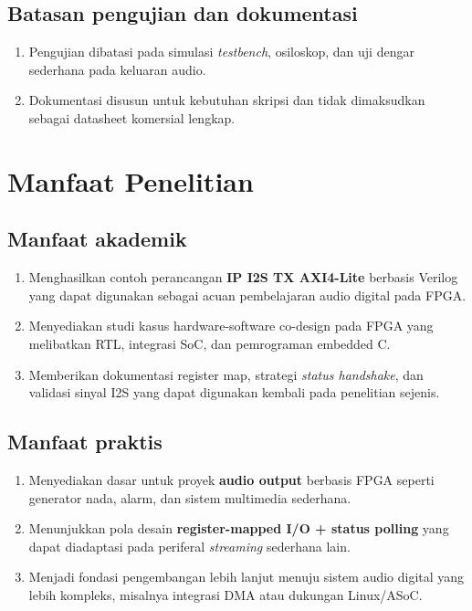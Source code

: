 \subsection{Batasan pengujian dan dokumentasi}
\begin{enumerate}
	\item Pengujian dibatasi pada simulasi \textit{testbench}, osiloskop, dan uji dengar sederhana pada keluaran audio.
	\item Dokumentasi disusun untuk kebutuhan skripsi dan tidak dimaksudkan sebagai datasheet komersial lengkap.
\end{enumerate}

\section{Manfaat Penelitian}

\subsection{Manfaat akademik}
\begin{enumerate}
	\item Menghasilkan contoh perancangan \textbf{IP I2S TX AXI4-Lite} berbasis Verilog yang dapat digunakan sebagai acuan pembelajaran audio digital pada FPGA.
	\item Menyediakan studi kasus hardware-software co-design pada FPGA yang melibatkan RTL, integrasi SoC, dan pemrograman embedded C.
	\item Memberikan dokumentasi register map, strategi \textit{status handshake}, dan validasi sinyal I2S yang dapat digunakan kembali pada penelitian sejenis.
\end{enumerate}

\subsection{Manfaat praktis}
\begin{enumerate}
	\item Menyediakan dasar untuk proyek \textbf{audio output} berbasis FPGA seperti generator nada, alarm, dan sistem multimedia sederhana.
	\item Menunjukkan pola desain \textbf{register-mapped I/O + status polling} yang dapat diadaptasi pada periferal \textit{streaming} sederhana lain.
	\item Menjadi fondasi pengembangan lebih lanjut menuju sistem audio digital yang lebih kompleks, misalnya integrasi DMA atau dukungan Linux/ASoC.
\end{enumerate}

